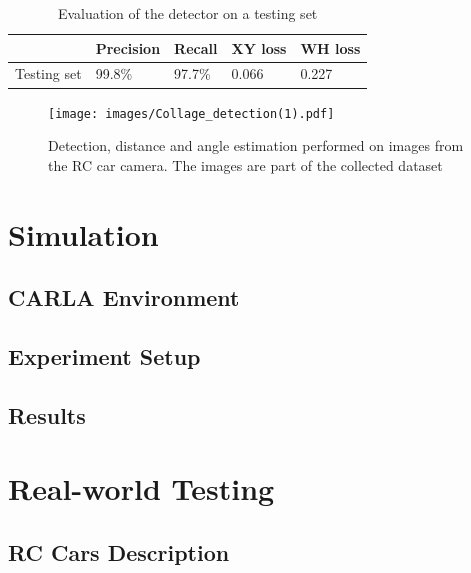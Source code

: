 \begin{table}[]
\begin{tabular}{l|llll}
\hline
            & Precision & Recall & XY loss & WH loss \\ \hline
Testing set & 99.8\%    & 97.7\% & 0.066   & 0.227   \\ \hline
\end{tabular}
\label{tab:detection}
\caption{Evaluation of the detector on a testing set}
\end{table}



\begin{figure}[h!]
    \centering
    \texttt{[image: images/Collage\_detection(1).pdf]}
    
    \caption{Detection, distance and angle estimation performed on images from the RC car camera. The images are part of the collected dataset}\label{f:detection_images}
\end{figure}

\section{Simulation}
\subsection{CARLA Environment}
\subsection{Experiment Setup}
\subsection{Results}

\section{Real-world Testing}
\subsection{RC Cars Description}
